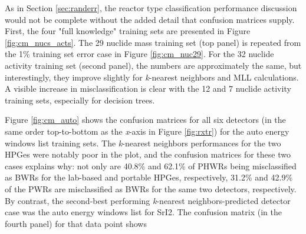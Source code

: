 As in Section \ref{sec:randerr}, the reactor type classification performance
discussion would not be complete without the added detail that confusion
matrices supply. First, the four "full knowledge" training sets are presented
in Figure \ref{fig:cm_nucs_acts}.  The 29 nuclide mass training set (top panel)
is repeated from the 1\% training set error case in Figure \ref{fig:cm_nuc29}.
For the 32 nuclide activity training set (second panel), the numbers are
approximately the same, but interestingly, they improve slightly for
\textit{k}-nearest neighbors and \gls{MLL} calculations.  A visible increase in
misclassification is clear with the 12 and 7 nuclide activity training sets,
especially for decision trees. 

Figure \ref{fig:cm_auto} shows the confusion matrices for all six detectors (in
the same order top-to-bottom as the \textit{x}-axis in Figure \ref{fig:rxtr})
for the auto energy windows list training sets. The \textit{k}-nearest
neighbors performances for the two \gls{HPGe}s were notably poor in the plot,
and the confusion matrices for these two cases explains why: not only are
40.8\% and 62.1\% of \gls{PHWR}s being misclassified as \gls{BWR}s for the
lab-based and portable \gls{HPGe}s, respectively, 31.2\% and 42.9\% of the
\gls{PWR}s are misclassified as \gls{BWR}s for the same two detectors,
respectively. By contrast, the second-best performing \textit{k}-nearest
neighbors-predicted detector case was the auto energy windows list for
\gls{SrI2}. The confusion matrix (in the fourth panel) for that data point 
shows 


